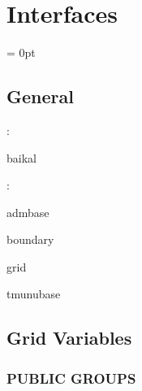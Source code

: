 
\section{Interfaces} 


\parskip = 0pt

\vspace{3mm} \subsection*{General}

: 

baikal
\vspace{2mm}

: 

admbase

boundary

grid

tmunubase
\vspace{2mm}
\subsection*{Grid Variables}
\vspace{5mm}\subsubsection{PUBLIC GROUPS}

\vspace{5mm}

